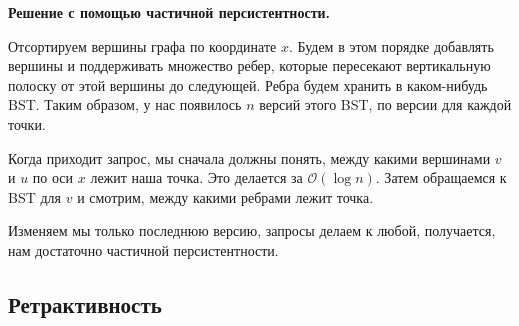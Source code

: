 


{\bf Решение с помощью частичной персистентности.}

Отсортируем вершины графа по координате $x$. 
Будем в этом порядке добавлять вершины и поддерживать множество ребер, которые пересекают вертикальную полоску от этой вершины до следующей.
Ребра будем хранить в каком-нибудь BST.
Таким образом, у нас появилось $n$ версий этого BST, по версии для каждой точки.

\vspace{10pt}

Когда приходит запрос, мы сначала должны понять, между какими вершинами $v$ и $u$ по оси $x$ лежит наша точка. 
Это делается за $\mathcal{O}(\log n)$.
Затем обращаемся к BST для $v$ и смотрим, между какими ребрами лежит точка.

Изменяем мы только последнюю версию, запросы делаем к любой, получается, нам достаточно частичной персистентности.

\subsection{Ретрактивность}

